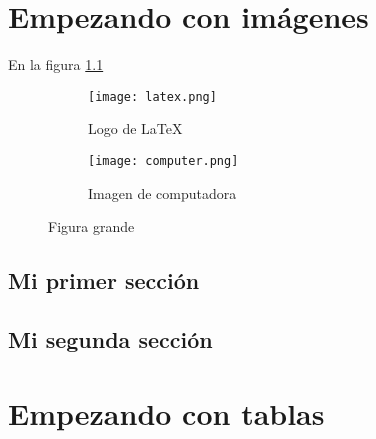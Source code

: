 \documentclass[12pt]{report}
\begin{document}
	\maketitle
	\tableofcontents
	\listoffigures
	\listoftables
	
	\chapter{Empezando con imágenes}
		
		En la figura \ref{fig:latex-logo}
		\lipsum[1][1-11]
	
		\begin{figure}[h]
			\centering
			\begin{subfigure}{0.4\textwidth}
				\centering
				\texttt{[image: latex.png]}
				\caption{Logo de \LaTeX}
				\label{fig:latex-logo}
			\end{subfigure}
			\hfill
			\begin{subfigure}{0.4\textwidth}
				\centering
				\texttt{[image: computer.png]}
				\caption{Imagen de computadora}
				\label{fig:computer-image}
			\end{subfigure}
			\caption{Figura grande}
			\label{fig:grande}
		\end{figure}
		
		\section{Mi primer sección}
			\lipsum[1-2]
			\lipsum[1][1-3]
		
		\section{Mi segunda sección}
			\lipsum[3-5]
			
	\chapter{Empezando con tablas}
		
\end{document}
